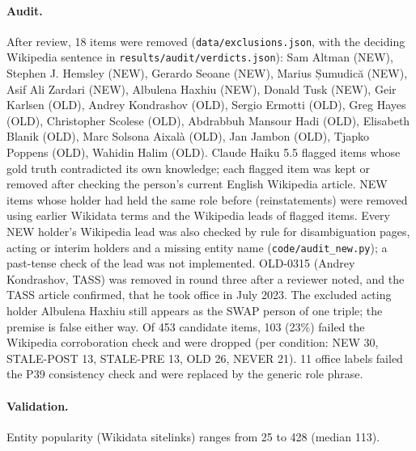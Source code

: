 \paragraph{Audit.} After review, 18 items were removed (\texttt{data/exclusions.json}, with the deciding Wikipedia sentence in \texttt{results/audit/verdicts.json}): Sam Altman (NEW), Stephen J. Hemsley (NEW), Gerardo Seoane (NEW), Marius Șumudică (NEW), Asif Ali Zardari (NEW), Albulena Haxhiu (NEW), Donald Tusk (NEW), Geir Karlsen (OLD), Andrey Kondrashov (OLD), Sergio Ermotti (OLD), Greg Hayes (OLD), Christopher Scolese (OLD), Abdrabbuh Mansour Hadi (OLD), Elisabeth Blanik (OLD), Marc Solsona Aixalà (OLD), Jan Jambon (OLD), Tjapko Poppens (OLD), Wahidin Halim (OLD). Claude Haiku 5.5 flagged items whose gold truth contradicted its own knowledge; each flagged item was kept or removed after checking the person's current English Wikipedia article. NEW items whose holder had held the same role before (reinstatements) were removed using earlier Wikidata terms and the Wikipedia leads of flagged items. Every NEW holder's Wikipedia lead was also checked by rule for disambiguation pages, acting or interim holders and a missing entity name (\texttt{code/audit\_new.py}); a past-tense check of the lead was not implemented. OLD-0315 (Andrey Kondrashov, TASS) was removed in round three after a reviewer noted, and the TASS article confirmed, that he took office in July 2023. The excluded acting holder Albulena Haxhiu still appears as the SWAP person of one triple; the premise is false either way.
Of 453 candidate items, 103 (23\%) failed the Wikipedia corroboration check and were dropped (per condition: NEW 30, STALE-POST 13, STALE-PRE 13, OLD 26, NEVER 21). 11 office labels failed the P39 consistency check and were replaced by the generic role phrase.
\paragraph{Validation.}
Entity popularity (Wikidata sitelinks) ranges from 25 to 428 (median 113).
